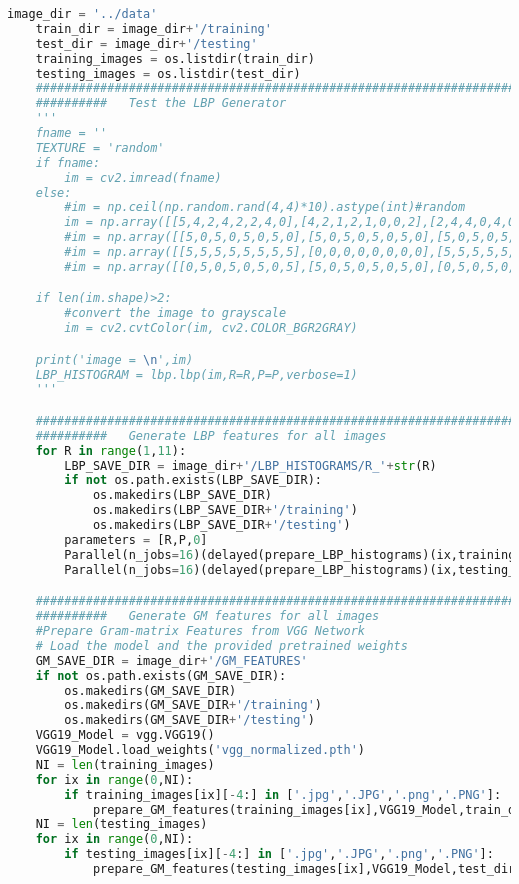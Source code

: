\documentclass{article}
\begin{document}
\begin{lstlisting}[language=Python]
	image_dir = '../data'
	train_dir = image_dir+'/training'
	test_dir = image_dir+'/testing'
	training_images = os.listdir(train_dir)
	testing_images = os.listdir(test_dir)
	###############################################################################################################
	##########   Test the LBP Generator
	'''
	fname = ''
	TEXTURE = 'random'
	if fname:
		im = cv2.imread(fname)
	else:
		#im = np.ceil(np.random.rand(4,4)*10).astype(int)#random
		im = np.array([[5,4,2,4,2,2,4,0],[4,2,1,2,1,0,0,2],[2,4,4,0,4,0,2,4],[4,1,5,0,4,0,5,5],[0,4,4,5,0,0,3,2],[2,0,4,3,0,3,1,2],[5,1,0,0,5,4,2,3],[1,0,0,4,5,5,0,1]])#arbitrary
		#im = np.array([[5,0,5,0,5,0,5,0],[5,0,5,0,5,0,5,0],[5,0,5,0,5,0,5,0],[5,0,5,0,5,0,5,0],[5,0,5,0,5,0,5,0],[5,0,5,0,5,0,5,0],[5,0,5,0,5,0,5,0],[5,0,5,0,5,0,5,0]])#vertical
		#im = np.array([[5,5,5,5,5,5,5,5],[0,0,0,0,0,0,0,0],[5,5,5,5,5,5,5,5],[0,0,0,0,0,0,0,0],[5,5,5,5,5,5,5,5],[0,0,0,0,0,0,0,0],[5,5,5,5,5,5,5,5],[0,0,0,0,0,0,0,0]])#horizontal
		#im = np.array([[0,5,0,5,0,5,0,5],[5,0,5,0,5,0,5,0],[0,5,0,5,0,5,0,5],[5,0,5,0,5,0,5,0],[0,5,0,5,0,5,0,5],[5,0,5,0,5,0,5,0],[0,5,0,5,0,5,0,5],[5,0,5,0,5,0,5,0]])#checkerboard

	if len(im.shape)>2:
		#convert the image to grayscale
		im = cv2.cvtColor(im, cv2.COLOR_BGR2GRAY)

	print('image = \n',im)
	LBP_HISTOGRAM = lbp.lbp(im,R=R,P=P,verbose=1)
	'''

	###############################################################################################################
	##########	 Generate LBP features for all images
	for R in range(1,11):
		LBP_SAVE_DIR = image_dir+'/LBP_HISTOGRAMS/R_'+str(R)
		if not os.path.exists(LBP_SAVE_DIR):
			os.makedirs(LBP_SAVE_DIR)
			os.makedirs(LBP_SAVE_DIR+'/training')
			os.makedirs(LBP_SAVE_DIR+'/testing')
		parameters = [R,P,0]
		Parallel(n_jobs=16)(delayed(prepare_LBP_histograms)(ix,training_images,train_dir,LBP_SAVE_DIR,'training',parameters) for ix in range(len(training_images)))
		Parallel(n_jobs=16)(delayed(prepare_LBP_histograms)(ix,testing_images,test_dir,LBP_SAVE_DIR,'testing',parameters) for ix in range(len(testing_images)))

	###############################################################################################################
	##########	 Generate GM features for all images
	#Prepare Gram-matrix Features from VGG Network
	# Load the model and the provided pretrained weights
	GM_SAVE_DIR = image_dir+'/GM_FEATURES'
	if not os.path.exists(GM_SAVE_DIR):
		os.makedirs(GM_SAVE_DIR)
		os.makedirs(GM_SAVE_DIR+'/training')
		os.makedirs(GM_SAVE_DIR+'/testing')
	VGG19_Model = vgg.VGG19()
	VGG19_Model.load_weights('vgg_normalized.pth')
	NI = len(training_images)
	for ix in range(0,NI):
		if training_images[ix][-4:] in ['.jpg','.JPG','.png','.PNG']:
			prepare_GM_features(training_images[ix],VGG19_Model,train_dir,GM_SAVE_DIR,'training',ix,NI)
	NI = len(testing_images)
	for ix in range(0,NI):
		if testing_images[ix][-4:] in ['.jpg','.JPG','.png','.PNG']:
			prepare_GM_features(testing_images[ix],VGG19_Model,test_dir,GM_SAVE_DIR,'testing',ix,NI)


\end{lstlisting}
\end{document}
